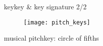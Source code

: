         \begin{frame}{key}{key \& key signature 2/2}
            \vspace{-3mm}
                \begin{figure}[t]
                    \centering
                    \texttt{[image: pitch\_keys]}
                \end{figure}
        \end{frame}
        
        \begin{frame}{musical pitch}{key: circle of fifths}
            \vspace{-9mm}
            \begin{figure}
            \scalebox{.9}
            {
                    \centering
                    
                
            }	
            \end{figure}
        \end{frame}
        
